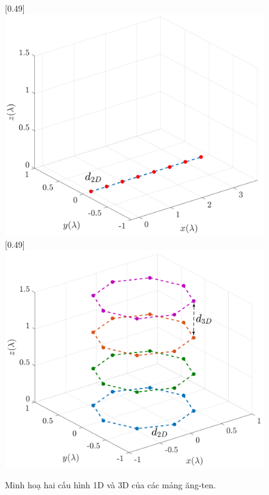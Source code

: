 \begin{figure}[ht]
    \centering
        [0.49\linewidth]
        {\includegraphics[width=\linewidth]{figures/ULA_2.pdf}}
    \hfill
        [0.49\linewidth]
        {\includegraphics[width=\linewidth]{figures/UCyA_2.pdf}}
    \caption{Minh hoạ hai cấu hình 1D và 3D của các mảng ăng-ten.}
    \label{fig:antenstruct}
\end{figure}

